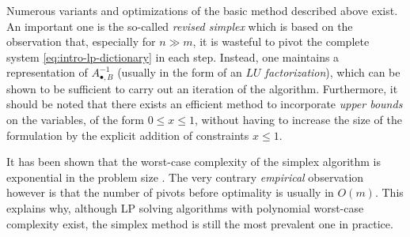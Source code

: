 Numerous variants and optimizations of the basic method described above exist. An important one is the so-called \emph{revised simplex} which is based on the observation that, especially for $n ≫ m$, it is wasteful to pivot the complete system \cref{eq:intro-lp-dictionary} in each step. Instead, one maintains a representation of $A_{•,B}^{-1}$ (usually in the form of an \emph{$LU$ factorization}), which can be shown to be sufficient to carry out an iteration of the algorithm. Furthermore, it should be noted that there exists an efficient method to incorporate \emph{upper bounds} on the variables, \eg of the form $0 ≤ x ≤ 1$, without having to increase the size of the formulation by the explicit addition of constraints $x ≤ 1$.

It has been shown that the worst-case complexity of the simplex algorithm is exponential in the problem size \cite{KleeMinty72Simplex}. The very contrary \emph{empirical} observation however is that the number of pivots before optimality is usually in $O(m)$. This explains why, although LP solving algorithms with polynomial worst-case complexity exist, the simplex method is still the most prevalent one in practice.
 
